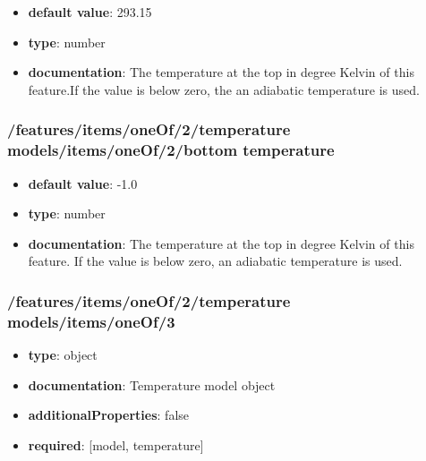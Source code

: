 \begin{itemize}\item {\bf default value}: 293.15
\item {\bf type}: number
\item {\bf documentation}: The temperature at the top in degree Kelvin of this feature.If the value is below zero, the an adiabatic temperature is used.
\end{itemize}\subsubsection{/features/items/oneOf/2/temperature models/items/oneOf/2/bottom temperature}
\begin{itemize}\item {\bf default value}: -1.0
\item {\bf type}: number
\item {\bf documentation}: The temperature at the top in degree Kelvin of this feature. If the value is below zero, an adiabatic temperature is used.
\end{itemize}\subsubsection{/features/items/oneOf/2/temperature models/items/oneOf/3}
\begin{itemize}\item {\bf type}: object
\item {\bf documentation}: Temperature model object
\item {\bf additionalProperties}: false
\item {\bf required}: [model, temperature]\end{itemize}
